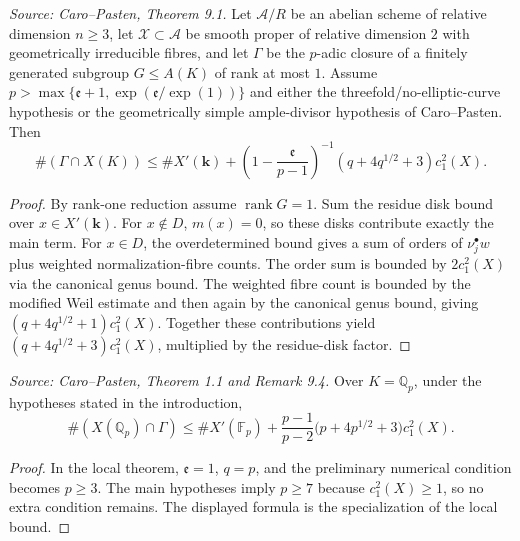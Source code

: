 \begin{theorem}
  \label{thm:cp_main_local}
  \textit{Source: Caro--Pasten, Theorem 9.1.}
  Let \(\mathcal A/R\) be an abelian scheme of relative dimension \(n\ge3\),
  let \(\mathcal X\subset\mathcal A\) be smooth proper of relative dimension
  \(2\) with geometrically irreducible fibres, and let
  \(\Gamma\) be the \(p\)-adic closure of a finitely generated subgroup
  \(G\le A(K)\) of rank at most \(1\).  Assume
  \(p>\max\{\mathfrak e+1,\exp(\mathfrak e/\exp(1))\}\) and either the
  threefold/no-elliptic-curve hypothesis or the geometrically simple
  ample-divisor hypothesis of Caro--Pasten.  Then
  \[
    \#(\Gamma\cap X(K))\le
    \#X'(\mathbf k)+
    \left(1-\frac{\mathfrak e}{p-1}\right)^{-1}
    (q+4q^{1/2}+3)c_1^2(X).
  \]
\end{theorem}
\begin{proof}
  By rank-one reduction assume \(\operatorname{rank}G=1\).  Sum the residue
  disk bound over \(x\in X'(\mathbf k)\).  For \(x\notin D\), \(m(x)=0\), so
  these disks contribute exactly the main term.  For \(x\in D\), the
  overdetermined bound gives a sum of orders of \(\nu_j^\bullet w\) plus
  weighted normalization-fibre counts.  The order sum is bounded by
  \(2c_1^2(X)\) via the canonical genus bound.  The weighted fibre count is
  bounded by the modified Weil estimate and then again by the canonical genus
  bound, giving \((q+4q^{1/2}+1)c_1^2(X)\).  Together these contributions
  yield \((q+4q^{1/2}+3)c_1^2(X)\), multiplied by the residue-disk factor.
\end{proof}

\begin{theorem}
  \label{thm:cp_main_qp}
  \textit{Source: Caro--Pasten, Theorem 1.1 and Remark 9.4.}
  Over \(K=\mathbb Q_p\), under the hypotheses stated in the introduction,
  \[
    \#(X(\mathbb Q_p)\cap\Gamma)
    \le \#X'(\mathbb F_p)+
    \frac{p-1}{p-2}\bigl(p+4p^{1/2}+3\bigr)c_1^2(X).
  \]
\end{theorem}
\begin{proof}
  In the local theorem, \(\mathfrak e=1\), \(q=p\), and the preliminary
  numerical condition becomes \(p\ge3\).  The main hypotheses imply
  \(p\ge7\) because \(c_1^2(X)\ge1\), so no extra condition remains.  The
  displayed formula is the specialization of the local bound.
\end{proof}

